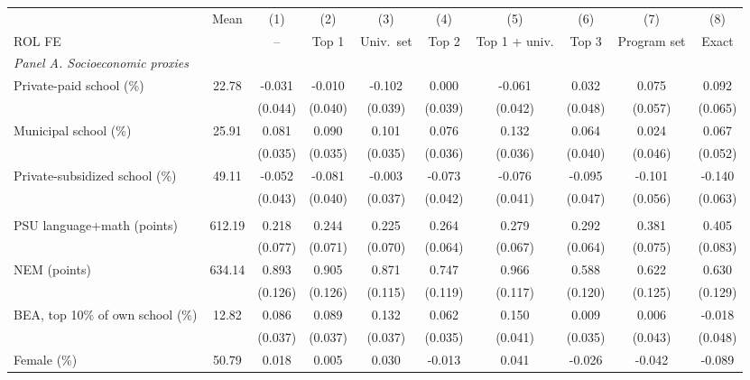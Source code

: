 \begin{tabular}{lc*{8}{c}}
\toprule
 & Mean & (1) & (2) & (3) & (4) & (5) & (6) & (7) & (8) \\
ROL FE &  & -- & Top 1 & Univ.\ set & Top 2 & Top 1 + univ. & Top 3 & Program set & Exact \\
\midrule
\multicolumn{10}{l}{\textit{Panel A. Socioeconomic proxies}} \\
Private-paid school (\%) &  22.78 & -0.031 & -0.010 & -0.102\sym{***} &  0.000 & -0.061 &  0.032 &  0.075 &  0.092 \\
 & & (0.044) & (0.040) & (0.039) & (0.039) & (0.042) & (0.048) & (0.057) & (0.065) \\
Municipal school (\%) &  25.91 &  0.081\sym{**} &  0.090\sym{***} &  0.101\sym{***} &  0.076\sym{**} &  0.132\sym{***} &  0.064 &  0.024 &  0.067 \\
 & & (0.035) & (0.035) & (0.035) & (0.036) & (0.036) & (0.040) & (0.046) & (0.052) \\
Private-subsidized school (\%) &  49.11 & -0.052 & -0.081\sym{**} & -0.003 & -0.073\sym{*} & -0.076\sym{*} & -0.095\sym{**} & -0.101\sym{*} & -0.140\sym{**} \\
 & & (0.043) & (0.040) & (0.037) & (0.042) & (0.041) & (0.047) & (0.056) & (0.063) \\
\addlinespace
\multicolumn{10}{l}{\textit{Panel B. Achievement and other predetermined}} \\
PSU language+math (points) & 612.19 &  0.218\sym{***} &  0.244\sym{***} &  0.225\sym{***} &  0.264\sym{***} &  0.279\sym{***} &  0.292\sym{***} &  0.381\sym{***} &  0.405\sym{***} \\
 & & (0.077) & (0.071) & (0.070) & (0.064) & (0.067) & (0.064) & (0.075) & (0.083) \\
NEM (points) & 634.14 &  0.893\sym{***} &  0.905\sym{***} &  0.871\sym{***} &  0.747\sym{***} &  0.966\sym{***} &  0.588\sym{***} &  0.622\sym{***} &  0.630\sym{***} \\
 & & (0.126) & (0.126) & (0.115) & (0.119) & (0.117) & (0.120) & (0.125) & (0.129) \\
BEA, top 10\% of own school (\%) &  12.82 &  0.086\sym{**} &  0.089\sym{**} &  0.132\sym{***} &  0.062\sym{*} &  0.150\sym{***} &  0.009 &  0.006 & -0.018 \\
 & & (0.037) & (0.037) & (0.037) & (0.035) & (0.041) & (0.035) & (0.043) & (0.048) \\
Female (\%) &  50.79 &  0.018 &  0.005 &  0.030 & -0.013 &  0.041 & -0.026 & -0.042 & -0.089 \\

\end{tabular}
